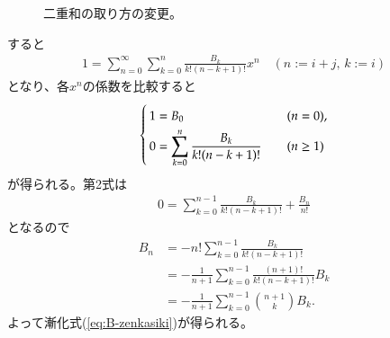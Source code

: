 \documentclass[11pt,b5paper,papersize,dvipdfmx]{jsbook}
\begin{document}
\begin{prf}
\begin{figure}[H]
    \caption{二重和の取り方の変更。}
    \label{fig:naname}
  \end{figure}
  すると
  \begin{align*}
    1 = \sum_{n=0}^\infty \sum_{k=0}^n \frac{B_k}{k!(n-k+1)!} x^n
    \quad (n:=i+j,\, k:=i)
  \end{align*}
  となり、各$x^n$の係数を比較すると
  \begin{align*}
    \begin{cases}
      1 = B_0 \vphantom{\dfrac00} &\quad (n=0),\\
      0 = \displaystyle\sum_{k=0}^n \dfrac{B_k}{k!(n-k+1)!} &\quad (n\ge1)
    \end{cases}
  \end{align*}
  が得られる。第2式は
  \begin{align*}
    0 = \sum_{k=0}^{n-1} \frac{B_k}{k!(n-k+1)!} + \frac{B_n}{n!}
  \end{align*}
  となるので
  \begin{align*}
    B_n &= - n! \sum_{k=0}^{n-1} \frac{B_k}{k!(n-k+1)!}\\
    &= -\frac1{n+1} \sum_{k=0}^{n-1} \frac{(n+1)!}{k!(n-k+1)!} B_k\\
    &= -\frac1{n+1} \sum_{k=0}^{n-1} \binom{n+1}{k} B_k.
  \end{align*}
  よって漸化式(\ref{eq:B-zenkasiki})が得られる。
\end{prf}
\end{document}
